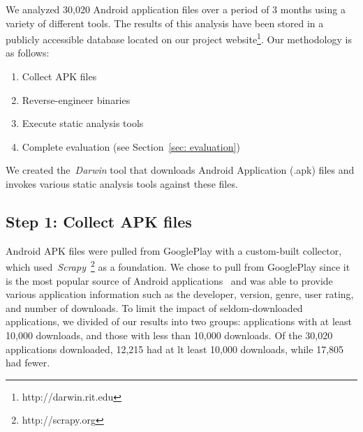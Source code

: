 


We analyzed 30,020 Android application files over a period of 3 months using a variety of different tools. The results of this analysis have been stored in a publicly accessible database located on our project website\footnote{http://darwin.rit.edu}. Our methodology is as follows:

\begin{enumerate}
  \item Collect APK files
  \item Reverse-engineer binaries
  \item Execute static analysis tools
  \item Complete evaluation (see Section~\ref{sec: evaluation})
\end{enumerate}

We created the~\emph{Darwin} tool that downloads Android Application (.apk) files and invokes various static analysis tools against these files.

\label{sec: collection}
\subsection{Step 1: Collect APK files}


Android APK files were pulled from GooglePlay with a custom-built collector, which used~\emph{Scrapy}~\footnote{http://scrapy.org} as a foundation. We chose to pull from GooglePlay since it is the most popular source of Android applications~\cite{listofstores_URL} and was able to provide various application information such as the developer, version, genre, user rating, and number of downloads. To limit the impact of seldom-downloaded applications, we divided of our results into two groups: applications with at least 10,000 downloads, and those with less than 10,000 downloads. Of the 30,020 applications downloaded, 12,215 had at lt least 10,000 downloads, while 17,805 had fewer.


